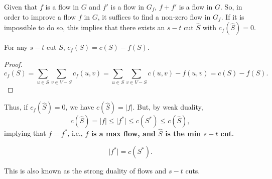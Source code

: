Given that $f$ is a flow in $G$ and $f'$ is a flow in $G_f$, $f+f'$ is a flow in $G$. So, in order to improve a flow $f$ in $G$, it suffices to find a non-zero flow in $G_f$. If it is impossible to do so, this implies that there exists an $s-t$ cut $\hat{S}$ with $c_f(\hat{S}) = 0$. 

\begin{theorem}
\proplabel

For any $s-t$ cut $S$, $c_f(S) = c(S) - f(S)$. 
\end{theorem}

\begin{proof}
\[c_f(S) = \sum_{u\in S}\sum_{v\in V-S}c_f(u,v) = \sum_{u\in S}\sum_{v\in V-S}c(u,v)-f(u,v) = c(S) - f(S).\]
\end{proof}

Thus, if $c_f(\hat{S})=0$, we have $c(\hat{S})=\vert f\vert$. But, by weak duality, 
\[c(\hat{S}) = \vert f\vert\leq \vert f^*\vert \leq c(S^*)\leq c(\hat{S}),\]
implying that $f=f^*$, i.e., \textbf{$f$ is a max flow, and $\hat{S}$ is the min $s-t$ cut}. 

\begin{theorem}
\[\vert f^*\vert = c(S^*).\]
\end{theorem}

This is also known as the \ac{strong duality} of flows and $s-t$ cuts. 